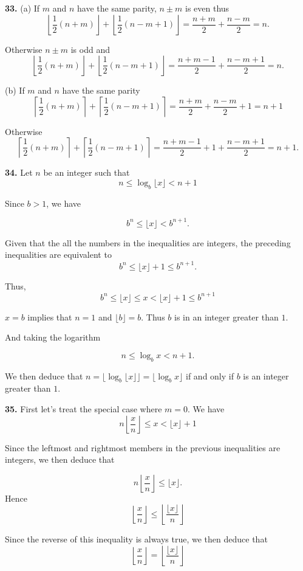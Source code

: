 \documentclass[a4paper,12pt]{article}
\newcommand{\newpar}[1]{\bigskip \noindent \textbf{#1.}}
\newcommand{\subpar}[1]{\medskip \noindent (#1)}
\begin{document}
\newpar{33} \subpar{a}  If $m$ and $n$ have the same parity, $n
\pm m$ is even thus
\[\left\lfloor \frac{1}{2}(n+m)\right\rfloor + \left\lfloor
\frac{1}{2}(n-m+1)\right\rfloor = \frac{n+m}{2} + \frac{n-m}{2} = n.\]

Otherwise $n\pm m$ is odd and
\[\left\lfloor \frac{1}{2}(n+m)\right\rfloor + \left\lfloor
\frac{1}{2}(n-m+1)\right\rfloor = \frac{n+m-1}{2} + \frac{n-m+1}{2} =
n.\]

\subpar{b} If $m$ and $n$ have the same parity
\[\left\lceil \frac{1}{2}(n+m)\right\rceil + \left\lceil
\frac{1}{2}(n-m+1) \right\rceil = \frac{n+m}{2} + \frac{n-m}{2} + 1 =
n+1\]

Otherwise
\[\left\lceil \frac{1}{2}(n+m)\right\rceil + \left\lceil
\frac{1}{2}(n-m+1) \right\rceil = \frac{n+m-1}{2} + 1 +
\frac{n-m+1}{2} = n+1.\]

\newpar{34} Let $n$ be an integer such that
\[ n \le \log_b \lfloor x\rfloor < n+1\]

Since $b>1$, we have

\[ b^n \le \lfloor x\rfloor < b^{n+1}.\]

Given that the all the numbers in the inequalities are integers, the
preceding inequalities are equivalent to
\[ b^n \le \lfloor x\rfloor +1\le b^{n+1}.\]

Thus,
\[ b^n \le \lfloor x\rfloor \le x < \lfloor x\rfloor + 1 \le b^{n+1}\]

$x = b$ implies that $n=1$ and $\lfloor b\rfloor = b$.
Thus $b$ is in an integer greater than $1$.

And taking the logarithm

\[ n \le \log_b x < n+1.\]

We then deduce that $n = \lfloor \log_b \lfloor x\rfloor \rfloor =
\lfloor \log_b x\rfloor$ if and only if $b$ is an integer greater than
$1$.

\newpar{35} First let's treat the special case where $m=0$.  We have
\[ n \left\lfloor \frac{x}{n}\right\rfloor \le x < \lfloor x\rfloor +
1\]

Since the leftmost and rightmost members in the previous inequalities
are integers, we then deduce that

\[ n \left\lfloor \frac{x}{n}\right\rfloor \le \lfloor x\rfloor.\]
Hence \[ \left\lfloor \frac{x}{n}\right\rfloor \le \left\lfloor
\frac{\lfloor x\rfloor}{n}\right\rfloor\]

Since the reverse of this inequality is always true, we then deduce
that
\[ \left\lfloor \frac{x}{n}\right\rfloor = \left\lfloor
\frac{\lfloor x\rfloor}{n}\right\rfloor\]
\end{document}
